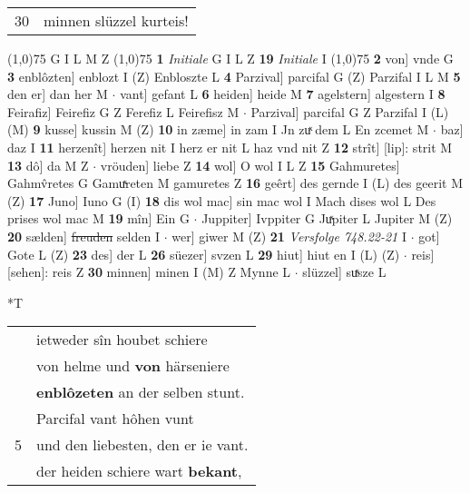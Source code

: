 \documentclass[8pt,a4paper,notitlepage]{article}
\begin{document}
\begin{table}[ht]
\begin{minipage}[t]{0.5\linewidth}
\begin{tabular}{rl}
30 & minnen slüzzel kurteis!\\ 
\end{tabular}
\scriptsize
\line(1,0){75} \newline
G I L M Z \newline
\line(1,0){75} \newline
\textbf{1} \textit{Initiale} G I L Z  \textbf{19} \textit{Initiale} I  \newline
\line(1,0){75} \newline
\textbf{2} von] vnde G \textbf{3} enblôzten] enblozt I (Z) Enbloszte L \textbf{4} Parzival] parcifal G (Z) Parzifal I L M \textbf{5} den er] dan her M  $\cdot$ vant] gefant L \textbf{6} heiden] heide M \textbf{7} agelstern] algestern I \textbf{8} Feirafiz] Feirefiz G Z Ferefiz L Feirefisz M  $\cdot$ Parzival] parcifal G Z Parzifal I (L) (M) \textbf{9} kusse] kussin M (Z) \textbf{10} in zæme] in zam I Jn zuͯ dem L En zcemet M  $\cdot$ baz] daz I \textbf{11} herzenît] herzen nit I herz er nit L haz vnd nit Z \textbf{12} strît] [lip]: strit M \textbf{13} dô] da M Z  $\cdot$ vröuden] liebe Z \textbf{14} wol] O wol I L Z \textbf{15} Gahmuretes] Gahmv̂retes G Gamuͯreten M gamuretes Z \textbf{16} geêrt] des gernde I (L) des geerit M (Z) \textbf{17} Juno] Iuno G (I) \textbf{18} dis wol mac] sin mac wol I Mach dises wol L Des prises wol mac M \textbf{19} mîn] Ein G  $\cdot$ Juppiter] Ivppiter G Juͯpiter L Jupiter M (Z) \textbf{20} sælden] \sout{freuden} selden I  $\cdot$ wer] giwer M (Z) \textbf{21} \textit{Versfolge 748.22-21} I   $\cdot$ got] Gote L (Z) \textbf{23} des] der L \textbf{26} süezer] svzen L \textbf{29} hiut] hiut en I (L) (Z)  $\cdot$ reis] [sehen]: reis Z \textbf{30} minnen] minen I (M) Z Mynne L  $\cdot$ slüzzel] suͯsze L \newline
\end{minipage}
\hspace{0.5cm}
\begin{minipage}[t]{0.5\linewidth}
\small
\begin{center}*T
\end{center}
\begin{tabular}{rl}
 & ietweder sîn houbet schiere\\ 
 & von helme und \textbf{von} härseniere\\ 
 & \textbf{enblôzeten} an der selben stunt.\\ 
 & Parcifal vant hôhen vunt\\ 
5 & und den liebesten, den er ie vant.\\ 
 & der heiden schiere wart \textbf{bekant},\\ 

\end{tabular}
\end{minipage}
\end{table}
\end{document}
